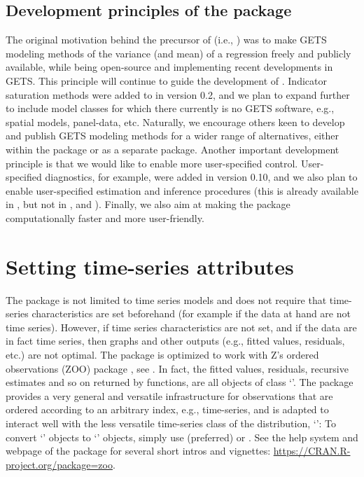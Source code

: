 \documentclass[article,nojss]{jss}
\begin{document}
\subsection[Development principles of the package gets]{Development principles of the package }
\label{subsec:development:principles}

The original motivation behind the precursor of  (i.e.,
) was to make GETS modeling methods of the variance
(and mean) of a regression freely and publicly available, while being
open-source and implementing recent developments in GETS. This
principle will continue to guide the development of
. Indicator saturation methods were added to  in
version 0.2, and we plan to expand  further to include model
classes for which there currently is no GETS software, e.g., spatial
models, panel-data, etc. Naturally, we encourage others keen to develop
and publish GETS modeling methods for a wider range of alternatives, 
either within the  package or as a separate package. Another important
development principle is that we would like to enable more
user-specified control. User-specified diagnostics, for example, were
added in version 0.10, and we also plan to enable user-specified
estimation and inference procedures (this is already available in
, but not in ,  and
). Finally, we also aim at making the package
computationally faster and more user-friendly.

\section{Setting time-series attributes}
\label{sec:setting:time:series:attributes}

The  package is not limited to time series models and does
not require that time-series characteristics are set beforehand (for
example if the data at hand are not time series). However, if time
series characteristics are not set, and if the data are in fact time
series, then graphs and other outputs (e.g., fitted values, residuals,
etc.) are not optimal. The  package is optimized to work
with Z's ordered observations (ZOO) package , see
\cite{ZeileisGrothendieck2005}. In fact, the fitted values, residuals,
recursive estimates and so on returned by  functions, are
all objects of class `'. The  package provides a very
general and versatile infrastructure for observations that are ordered
according to an arbitrary index, e.g., time-series, and  is
adapted to interact well with the less versatile time-series class of
the  distribution, `': To convert `' objects
to `' objects, simply use  (preferred) or
. See the help system and webpage of the 
package for several short intros and vignettes:
\url{https://CRAN.R-project.org/package=zoo}.
\end{document}
